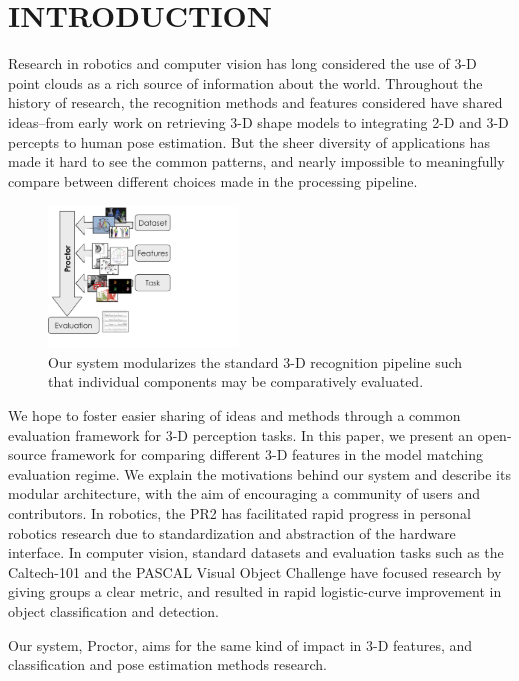 \section{INTRODUCTION}
Research in robotics and computer vision has long considered the use of 3-D point clouds as a rich source of information about the world.
Throughout the history of research, the recognition methods and features considered have shared ideas--from early work on retrieving 3-D shape models to integrating 2-D and 3-D percepts to human pose estimation.
But the sheer diversity of applications has made it hard to see the common patterns, and nearly impossible to meaningfully compare between different choices made in the processing pipeline.

\begin{figure}[thpb]
   \centering
   \includegraphics[width=0.45\textwidth]{../figures/figure1.pdf}
   \caption{Our system modularizes the standard 3-D recognition pipeline such that individual components may be comparatively evaluated.}
   \label{fig:figure1}
\end{figure}

We hope to foster easier sharing of ideas and methods through a common evaluation framework for 3-D perception tasks.
In this paper, we present an open-source framework for comparing different 3-D features in the model matching evaluation regime.
We explain the motivations behind our system and describe its modular architecture, with the aim of encouraging a community of users and contributors.
In robotics, the PR2  has facilitated rapid progress in personal robotics research due to standardization and abstraction of the hardware interface.
In computer vision, standard datasets and evaluation tasks such as the Caltech-101 \cite{FeiFei2007a} and the PASCAL Visual Object Challenge \cite{pascal-voc-2010} have focused research by giving groups a clear metric, and resulted in rapid logistic-curve improvement in object classification and detection.

Our system, Proctor, aims for the same kind of impact in 3-D features, and classification and pose estimation methods research.

